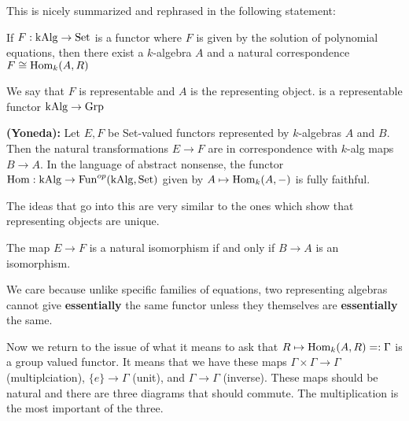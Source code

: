 \documentclass[12pt]{article}
\begin{document}
\hfill

This is nicely summarized and rephrased in the following statement:
\begin{theorem}
If $F:\operatorname{kAlg}\to \operatorname{Set}$ is a functor where $F$ is given by the solution of polynomial equations, then there exist a $k$-algebra $A$ and a natural correspondence $F\cong \operatorname{Hom}_k(A,R)$
\end{theorem}

\begin{definition}
    We say that $F$ is representable and $A$ is the representing object.  is a representable functor $\operatorname{kAlg}\to\operatorname{Grp}$
\end{definition}

\begin{lemma}
\textbf{(Yoneda):} Let $E,F$ be Set-valued functors represented by $k$-algebras $A$ and $B$. Then the natural transformations $E\to F$ are in correspondence with $k$-alg maps $B\to A$. In the language of abstract nonsense, the functor $\operatorname{Hom}:\operatorname{kAlg}\to\operatorname{Fun}^{op}(\operatorname{kAlg},\operatorname{Set})$ given by $A\mapsto \operatorname{Hom}_k(A,-)$ is fully faithful.
\end{lemma}
\begin{remark}
The ideas that go into this are very similar to the ones which show that representing objects are unique.
\end{remark}
\begin{corollary}
The map $E\to F$ is a natural isomorphism if and only if $B\to A$ is an isomorphism.
\end{corollary}
We care because unlike specific families of equations, two representing algebras cannot give \textbf{essentially} the same functor unless they themselves are \textbf{essentially} the same. 

\hfill

Now we return to the issue of what it means to ask that $R\mapsto \operatorname{Hom}_k(A,R) =: \Gamma$ is a group valued functor. It means that we have these maps $\Gamma\times\Gamma\to\Gamma$ (multiplciation), $\{e\}\to\Gamma$ (unit), and $\Gamma\to\Gamma$ (inverse). These maps should be natural and there are three diagrams that should commute. The multiplication is the most important of the three.

\hfill

\end{document}
